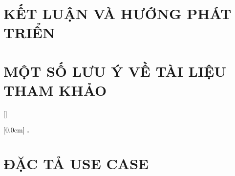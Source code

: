 \documentclass[a4paper,oneside]{report}
\renewcommand{\bibname}{Danh_sach_tai_lieu_tham_khao}
\theoremstyle{definition}
\begin{document}
\chapter{KẾT LUẬN VÀ HƯỚNG PHÁT TRIỂN} %
\label{chapter:conclusion}


\newpage
\chapter*{MỘT SỐ LƯU Ý VỀ TÀI LIỆU THAM KHẢO} %
\label{chapter:reference}



\newpage
\renewcommand\bibname{TÀI LIỆU THAM KHẢO}
\printbibliography
{}

\appendixpage
\appendices
\addappheadtotoc


{}[]
\titlespacing*{\chapter}{0pt}{-20pt}{20pt}

    [0.0cm]             %
    {\bfseries\vspace{0.3cm}}                  %
    {{\bfseries{\scshape} \thecontentslabel.\ }} %
    {}         %
    {\contentspage}         %
\chapter{ĐẶC TẢ USE CASE}

\newpage
\end{document}
